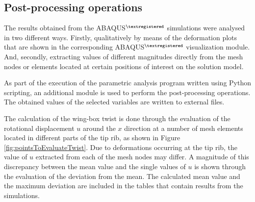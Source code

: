   \clearpage
  \subsection{Post-processing operations} \label{subsec:postProc_computationalModel} %

    The results obtained from the ABAQUS$^{\textregistered}$ simulations were analysed in two different ways. Firstly, qualitatively by means of the deformation plots that are shown in the corresponding ABAQUS$^{\textregistered}$ visualization module. And, secondly, extracting values of different magnitudes directly from the mesh nodes or elements located at certain positions of interest on the solution model.

    As part of the execution of the parametric analysis program written using Python scripting, an additional module is used to perform the post-processing operations. The obtained values of the selected variables are written to external files. 

    The calculation of the wing-box twist is done through the evaluation of the rotational displacement $u$ around the $x$ direction at a number of mesh elements located in different parts of the tip rib, as shown in Figure \ref{fig:pointsToEvaluateTwist}. Due to deformations occurring at the tip rib, the value of $u$ extracted from each of the mesh nodes may differ. A magnitude of this discrepancy between the mean value and the single values of $u$ is shown through the evaluation of the deviation from the mean. The calculated mean value and the maximum deviation are included in the tables that contain results from the simulations.

